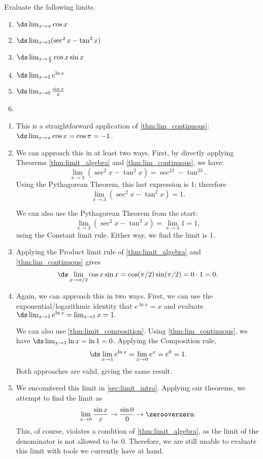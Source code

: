 \begin{example}\label{ex_limit_1}
Evaluate the following limits.
\begin{multicols}{2}
\begin{enumerate}
\item		$\ds \lim_{x\to \pi} \cos x$
\item		$\ds \lim_{x\to 3} (\sec^2x - \tan^2 x)$
\item		$\ds \lim_{x\to \frac\pi2} \cos x\sin x$
\item		$\ds \lim_{x\to 1} e^{\ln x}$
\item		$\ds \lim_{x\to 0} \frac{\sin x}{x}$
\item[]
\end{enumerate}
\end{multicols}
\solution
\begin{enumerate}
	\item	This is a straightforward application of \autoref{thm:lim_continuous}:\\
	 $\ds \lim_{x\to \pi} \cos x = \cos \pi = -1$.
	\item	We can approach this in at least two ways. First, by directly applying Theorems \ref{thm:limit_algebra} and \ref{thm:lim_continuous}, we have:
	\[\lim_{x\to 3} (\sec^2x - \tan^2 x) = \sec^23-\tan^23.\]
	Using the Pythagorean Theorem, this last expression is 1; therefore
	\[\lim_{x\to 3} (\sec^2x - \tan^2 x) = 1.\]

	We can also use the Pythagorean Theorem from the start:
	\[\lim_{x\to 3} (\sec^2x - \tan^2 x) = \lim_{x\to 3} 1 = 1,\]
	using the Constant limit rule. Either way, we find the limit is 1.
	
	\item	Applying the Product limit rule of \autoref{thm:limit_algebra} and \autoref{thm:lim_continuous} gives
	\[\ds \lim_{x\to \pi/2} \cos x\sin x = \cos (\pi/2)\sin(\pi/2) = 0\cdot 1 = 0.\]

	\item	Again, we can approach this in two ways. First, we can use the exponential/logarithmic identity that $e^{\ln x} = x$ and evaluate $\ds \lim_{x\to 1} e^{\ln x} = \lim_{x\to 1} x = 1.$ 

	We can also use \autoref{thm:limit_composition}. Using \autoref{thm:lim_continuous}, we have $\ds \lim_{x\to 1}\ln x = \ln 1 = 0$. Applying the Composition rule,
	\[\ds \lim_{x\to 1} e^{\ln x} = \lim_{x\to 0} e^x = e^0 = 1.\]
	Both approaches are valid, giving the same result.
		
	\item	We encountered this limit in \autoref{sec:limit_intro}. Applying our theorems, we attempt to find the limit as
	\[\lim_{x\to 0}\frac{\sin x}{x}\to\frac{\sin 0}{0} \to\zerooverzero.\]
	This, of course, violates a condition of \autoref{thm:limit_algebra}, as the limit of the denominator is not allowed to be 0. Therefore, we are still unable to evaluate this limit with tools we currently have at hand.
\end{enumerate}
\end{example}

